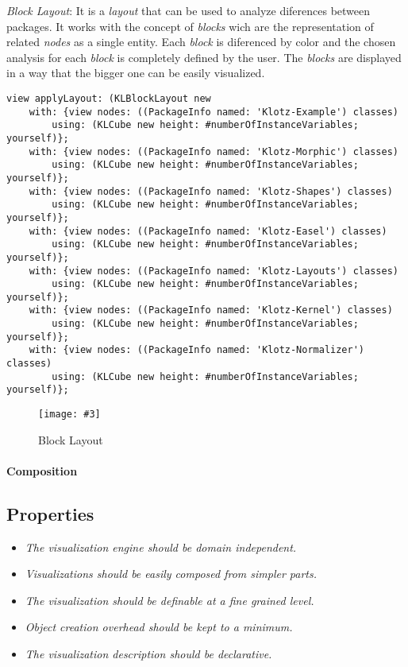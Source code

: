 \documentclass[runningheads]{llncs}
\newcommand{\fig}[4]{
	\begin{figure}[#1]
		\centering
		\texttt{[image: \#3]}
		\caption{\label{fig:#3}#4}
	\end{figure}}
\newcommand{\seclabel}[1]{\label{sec:#1}}
\begin{document}
\emph{Block Layout}: It is a \emph{layout} that can be used to 
analyze diferences between packages. It works with the concept
of \emph{blocks} wich are the representation of related \emph{nodes}
as a single entity. Each \emph{block} is diferenced by color and the
chosen analysis for each \emph{block} is completely defined by the
user. The \emph{blocks} are displayed in a way that the bigger one
can be easily visualized.
\begin{lstlisting}
view applyLayout: (KLBlockLayout new
	with: {view nodes: ((PackageInfo named: 'Klotz-Example') classes) 
		using: (KLCube new height: #numberOfInstanceVariables; yourself)};
	with: {view nodes: ((PackageInfo named: 'Klotz-Morphic') classes)
		using: (KLCube new height: #numberOfInstanceVariables; yourself)};
	with: {view nodes: ((PackageInfo named: 'Klotz-Shapes') classes)
		using: (KLCube new height: #numberOfInstanceVariables; yourself)};
	with: {view nodes: ((PackageInfo named: 'Klotz-Easel') classes)
		using: (KLCube new height: #numberOfInstanceVariables; yourself)};
	with: {view nodes: ((PackageInfo named: 'Klotz-Layouts') classes)
		using: (KLCube new height: #numberOfInstanceVariables; yourself)};
	with: {view nodes: ((PackageInfo named: 'Klotz-Kernel') classes)
		using: (KLCube new height: #numberOfInstanceVariables; yourself)};
	with: {view nodes: ((PackageInfo named: 'Klotz-Normalizer') classes)
		using: (KLCube new height: #numberOfInstanceVariables; yourself)};
\end{lstlisting}
\fig{}{0.7}{figure9.png}{Block Layout}

\paragraph{Composition}

\subsection{Properties} \seclabel{properties}

\begin{itemize}
\item \emph{The visualization engine should be domain independent.}
\item \emph{Visualizations should be easily composed from simpler parts.}
\item \emph{The visualization should be definable at a fine grained level.}
\item \emph{Object creation overhead should be kept to a minimum.}
\item \emph{The visualization description should be declarative.}
\end{itemize}
\end{document}
